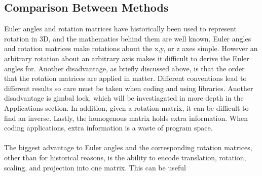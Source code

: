 \subsection{Comparison Between Methods}
Euler angles and rotation matrices have historically been used to represent rotation in 3D, and the mathematics behind them are well known.
Euler angles and rotation matrices make rotations about the x,y, or z axes simple.
However an arbitrary rotation about an arbitrary axis makes it difficult to derive the Euler angles for.
Another disadvantage, as briefly discussed above, is that the order that the rotation matrices are applied in matter.
Different conventions lead to different results so care must be taken when coding and using libraries.
Another disadvantage is gimbal lock, which will be investiagated in more depth in the Applications section.
In addition, given a rotation matrix, it can be difficult to find an inverse.
Lastly, the homogenous matrix holds extra information.
When coding applications, extra information is a waste of program space.
\\ \\ \noindent The biggest advantage to Euler angles and the corresponding rotation matrices, other than for historical reasons, is the ability to encode translation, rotation, scaling, and projection into one matrix.
This can be useful 

